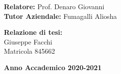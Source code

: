 \begin{titlepage}
	\vspace{40mm}
	
	\noindent
	{\large \textbf{Relatore:} Prof. Denaro Giovanni } \\
	
	\noindent
	{\large \textbf{Tutor Aziendale:} Fumagalli Aliosha} \\
	
    
	\vspace{15mm}
	
	\begin{flushright}
		{\large \textbf{Relazione di tesi:}} \\
		\large{Giuseppe Facchi} \\
		\large{Matricola 845662} 
	\end{flushright}
	
	\vspace{20mm}
	\begin{center}
		{\large{\bf Anno Accademico 2020-2021}}
	\end{center}
	
	\restoregeometry
	
\end{titlepage}
